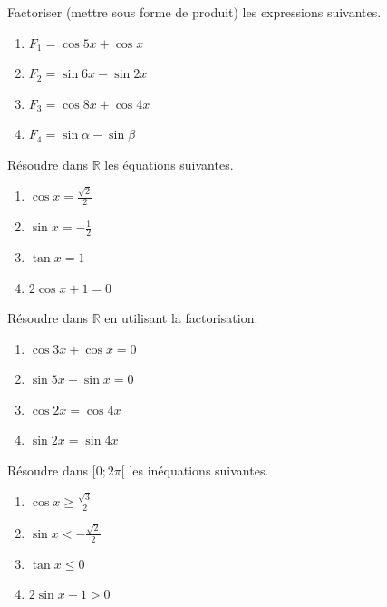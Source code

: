 \documentclass[11pt]{article}
\begin{document}
\begin{exercice}
Factoriser (mettre sous forme de produit) les expressions suivantes.
\begin{enumerate}
    \item $F_1 = \cos 5x + \cos x$
    \item $F_2 = \sin 6x - \sin 2x$
    \item $F_3 = \cos 8x + \cos 4x$
    \item $F_4 = \sin \alpha - \sin \beta$
\end{enumerate}
\end{exercice}

\begin{exercice}
Résoudre dans $\mathbb{R}$ les équations suivantes.
\begin{enumerate}
    \item $\cos x = \frac{\sqrt{2}}{2}$
    \item $\sin x = -\frac{1}{2}$
    \item $\tan x = 1$
    \item $2\cos x + 1 = 0$
\end{enumerate}
\end{exercice}

\begin{exercice}
Résoudre dans $\mathbb{R}$ en utilisant la factorisation.
\begin{enumerate}
    \item $\cos 3x + \cos x = 0$
    \item $\sin 5x - \sin x = 0$
    \item $\cos 2x = \cos 4x$
    \item $\sin 2x = \sin 4x$
\end{enumerate}
\end{exercice}

\begin{exercice}
Résoudre dans $[0 ; 2\pi[$ les inéquations suivantes.
\begin{enumerate}
    \item $\cos x \geq \frac{\sqrt{3}}{2}$
    \item $\sin x < -\frac{\sqrt{2}}{2}$
    \item $\tan x \leq 0$
    \item $2\sin x - 1 > 0$
\end{enumerate}
\end{exercice}
\end{document}
